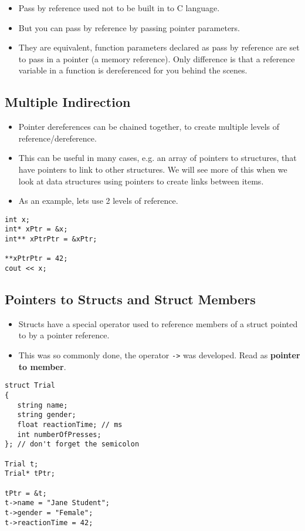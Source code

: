 \documentclass[11pt]{article}
\begin{document}
\begin{itemize}
\item Pass by reference used not to be built in to C language.
\item But you can pass by reference by passing pointer parameters.
\item They are equivalent, function parameters declared as pass by reference
  are set to pass in a pointer (a memory reference).  Only difference is
  that a reference variable in a function is dereferenced for you behind the
  scenes.
\end{itemize}
\subsection{Multiple Indirection}
\label{sec-3-2}

\begin{itemize}
\item Pointer dereferences can be chained together, to create multiple levels of
  reference/dereference.
\item This can be useful in many cases, e.g. an array of pointers to structures, that have pointers
  to link to other structures.  We will see more of this when we look at data structures using
  pointers to create links between items.
\item As an example, lets use 2 levels of reference.
\end{itemize}

\begin{verbatim}
int x;
int* xPtr = &x;
int** xPtrPtr = &xPtr;

**xPtrPtr = 42;
cout << x;
\end{verbatim}
\subsection{Pointers to Structs and Struct Members}
\label{sec-3-3}

\begin{itemize}
\item Structs have a special operator used to reference members of a struct pointed to
  by a pointer reference.
\item This was so commonly done, the operator \verb~->~ was developed.  Read as \textbf{pointer to member}.
\end{itemize}

\begin{verbatim}
struct Trial
{
   string name;
   string gender;
   float reactionTime; // ms
   int numberOfPresses;
}; // don't forget the semicolon

Trial t;
Trial* tPtr;

tPtr = &t;
t->name = "Jane Student";
t->gender = "Female";
t->reactionTime = 42;
\end{verbatim}
\end{document}
